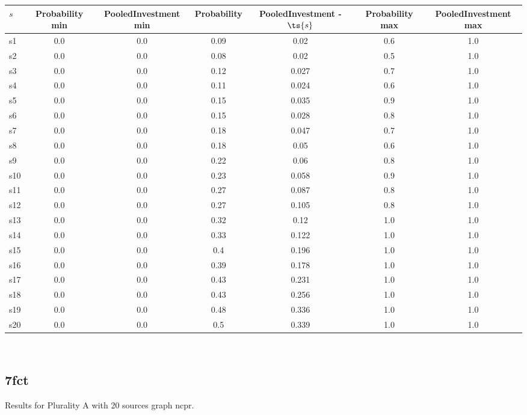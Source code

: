\documentclass{article}
\begin{document}
\noindent\begin{tabular}{|l|c|c|c|c|c|c|}
\hline
$s$& Probability min & PooledInvestment min & Probability & PooledInvestment - $\ts{s}$ & Probability max & PooledInvestment max\\
\hline
s1 &0.0 & 0.0 & 0.09 & 0.02 & 0.6 & 1.0\\
\hline
s2 &0.0 & 0.0 & 0.08 & 0.02 & 0.5 & 1.0\\
\hline
s3 &0.0 & 0.0 & 0.12 & 0.027 & 0.7 & 1.0\\
\hline
s4 &0.0 & 0.0 & 0.11 & 0.024 & 0.6 & 1.0\\
\hline
s5 &0.0 & 0.0 & 0.15 & 0.035 & 0.9 & 1.0\\
\hline
s6 &0.0 & 0.0 & 0.15 & 0.028 & 0.8 & 1.0\\
\hline
s7 &0.0 & 0.0 & 0.18 & 0.047 & 0.7 & 1.0\\
\hline
s8 &0.0 & 0.0 & 0.18 & 0.05 & 0.6 & 1.0\\
\hline
s9 &0.0 & 0.0 & 0.22 & 0.06 & 0.8 & 1.0\\
\hline
s10 &0.0 & 0.0 & 0.23 & 0.058 & 0.9 & 1.0\\
\hline
s11 &0.0 & 0.0 & 0.27 & 0.087 & 0.8 & 1.0\\
\hline
s12 &0.0 & 0.0 & 0.27 & 0.105 & 0.8 & 1.0\\
\hline
s13 &0.0 & 0.0 & 0.32 & 0.12 & 1.0 & 1.0\\
\hline
s14 &0.0 & 0.0 & 0.33 & 0.122 & 1.0 & 1.0\\
\hline
s15 &0.0 & 0.0 & 0.4 & 0.196 & 1.0 & 1.0\\
\hline
s16 &0.0 & 0.0 & 0.39 & 0.178 & 1.0 & 1.0\\
\hline
s17 &0.0 & 0.0 & 0.43 & 0.231 & 1.0 & 1.0\\
\hline
s18 &0.0 & 0.0 & 0.43 & 0.256 & 1.0 & 1.0\\
\hline
s19 &0.0 & 0.0 & 0.48 & 0.336 & 1.0 & 1.0\\
\hline
s20 &0.0 & 0.0 & 0.5 & 0.339 & 1.0 & 1.0\\
\hline
\end{tabular}\\

\newpage

\subsection{7fct}

\noindent Results for Plurality A with 20 sources graph ncpr.
\end{document}
